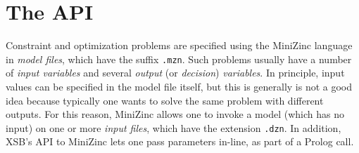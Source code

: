 \section{The API}

Constraint and optimization problems are specified using the MiniZinc
language in \emph{model files}, which have the suffix \texttt{.mzn}.
Such problems usually have a number of \emph{input variables}   and several
\emph{output} (or \emph{decision}) \emph{variables}.   
In principle, input values can be specified in the model file itself, but
this is generally is not a good idea because typically one wants to solve
the same problem with different outputs.
For this reason, MiniZinc allows one to invoke a model (which has no input)
on one or more \emph{input files}, which have the extension \texttt{.dzn}. 
In addition, XSB's API to MiniZinc lets one pass parameters in-line, as
part of a Prolog call.

